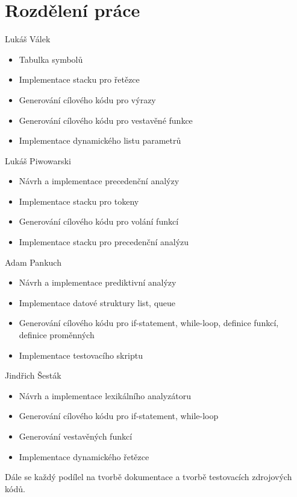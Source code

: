 \documentclass[11pt, a4paper]{article}
\begin{document}
\newpage
\section{Rozdělení práce}
Lukáš Válek
\vspace{-0.6em}
\begin{itemize}
  \item{Tabulka symbolů}
  \vspace{-0.6em}
  \item{Implementace stacku pro řetězce}
  \vspace{-0.6em}
  \item{Generování cílového kódu pro výrazy}
  \vspace{-0.6em}
  \item{Generování cílového kódu pro vestavěné funkce}
  \vspace{-0.6em}
  \item{Implementace dynamického listu parametrů}
\end{itemize}
Lukáš Piwowarski
\vspace{-0.6em}
\begin{itemize}
  \item{Návrh a implementace precedenční analýzy}
  \vspace{-0.6em}
  \item{Implementace stacku pro tokeny}
  \vspace{-0.6em}
  \item{Generování cílového kódu pro volání funkcí}
  \vspace{-0.6em}
  \item{Implementace stacku pro precedenční analýzu}
\end{itemize}
Adam Pankuch
\vspace{-0.6em}
\begin{itemize}
  \item{Návrh a implementace prediktivní analýzy}
  \vspace{-0.6em}
  \item{Implementace datové struktury list, queue}
  \vspace{-0.6em}
  \item{Generování cílového kódu pro if-statement, while-loop, definice funkcí, definice proměnných}
  \vspace{-0.6em}
  \item{Implementace testovacího skriptu}
\end{itemize}
Jindřich Šesták
\vspace{-0.6em}
\begin{itemize}
  \item{Návrh a implementace lexikálního analyzátoru}
  \vspace{-0.6em}
  \item{Generování cílového kódu pro if-statement, while-loop}
  \vspace{-0.6em}
  \item{Generování vestavěných funkcí}
  \vspace{-0.6em}
  \item{Implementace dynamického řetězce}
\end{itemize}
Dále se každý podílel na tvorbě dokumentace a tvorbě testovacích zdrojových kódů.
\end{document}
